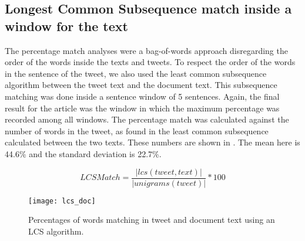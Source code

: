 \subsection{Longest Common Subsequence match inside a window for the text}

The percentage match analyses were a bag-of-words approach disregarding the order of the words inside the texts and tweets. To respect the order of the words in the sentence of the tweet, we also used the least common subsequence algorithm between the tweet text and the document text. This subsequence matching was done inside a sentence window of 5 sentences. Again, the final result for the article was the window in which the maximum percentage was recorded among all windows. The percentage match was calculated against the number of words in the tweet, as found in the least common subsequence calculated between the two texts. These numbers are shown in . The mean here is 44.6\% and the standard deviation is 22.7\%. 

\begin{equation}
LCSMatch = \frac{| lcs(tweet, text) |}{| unigrams(tweet) |} * 100
\end{equation}

\begin{figure}[htbp]
\centering
\texttt{[image: lcs\_doc]}
\caption{Percentages of words matching in tweet and document text using an LCS algorithm.}
\label{fig:lcs}
\end{figure}
